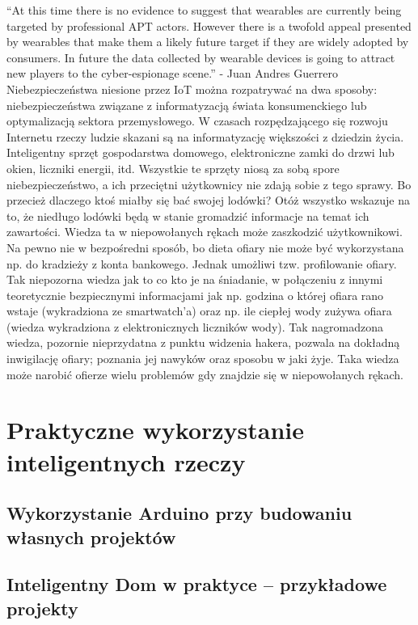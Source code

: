 \documentclass[brudnopis]{xmgr}
\begin{document}
“At this time there is no evidence to suggest that wearables are currently being targeted by professional APT actors. However there is a twofold appeal presented by wearables that make them a likely future target if they are widely adopted by consumers.  In future the data collected by wearable devices is going to attract new players to the cyber-espionage scene.” -  Juan Andres Guerrero
Niebezpieczeństwa niesione przez IoT można rozpatrywać na dwa sposoby: niebezpieczeństwa związane z informatyzacją świata konsumenckiego lub optymalizacją sektora przemysłowego.
W czasach rozpędzającego się rozwoju Internetu rzeczy ludzie skazani są na informatyzację większości z dziedzin życia. Inteligentny sprzęt gospodarstwa domowego, elektroniczne zamki do drzwi lub okien, liczniki energii, itd. Wszystkie te sprzęty niosą za sobą spore niebezpieczeństwo, a ich przeciętni użytkownicy nie zdają sobie z tego sprawy. Bo przecież dlaczego ktoś miałby się bać swojej lodówki? Otóż wszystko wskazuje na to, że niedługo lodówki będą w stanie gromadzić informacje na temat ich zawartości. Wiedza ta w niepowołanych rękach może zaszkodzić użytkownikowi. Na pewno nie w bezpośredni sposób, bo dieta ofiary nie może być wykorzystana np. do kradzieży z konta bankowego. Jednak umożliwi tzw. profilowanie ofiary. Tak niepozorna wiedza jak to co kto je na śniadanie, w połączeniu z innymi teoretycznie bezpiecznymi informacjami jak np. godzina o której ofiara rano wstaje (wykradziona ze smartwatch'a) oraz np. ile ciepłej wody zużywa ofiara (wiedza wykradziona z elektronicznych liczników wody). Tak nagromadzona wiedza, pozornie nieprzydatna z punktu widzenia hakera, pozwala na dokładną inwigilację ofiary; poznania jej nawyków oraz sposobu w jaki żyje. Taka wiedza może narobić ofierze wielu problemów gdy znajdzie się w niepowołanych rękach.

\chapter{Praktyczne wykorzystanie inteligentnych rzeczy}


\section{Wykorzystanie Arduino przy budowaniu własnych projektów}


\section{Inteligentny Dom w praktyce – przykładowe projekty}
\end{document}
